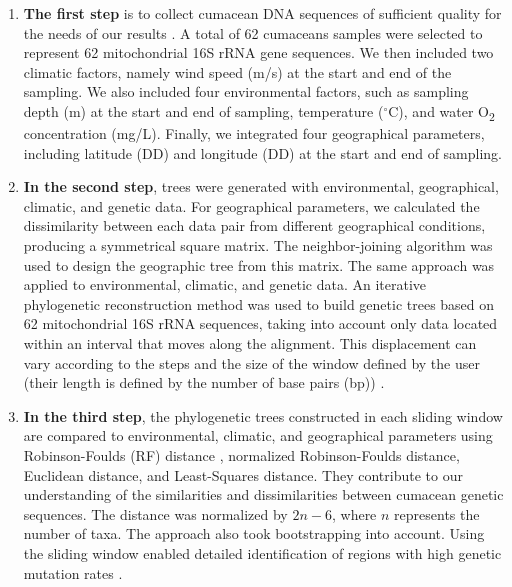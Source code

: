 \begin{enumerate}
\item \textbf{The first step} is to collect cumacean DNA sequences of sufficient quality for the needs of our results \citep{koshkarov_phylogeography_2022}. A total of 62 cumaceans samples were selected to represent 62 mitochondrial 16S rRNA gene sequences. We then included two climatic factors, namely wind speed (m/s) at the start and end of the sampling. We also included four environmental factors, such as sampling depth (m) at the start and end of sampling, temperature ($^\circ$C), and water O\textsubscript{2} concentration (mg/L). Finally, we integrated four geographical parameters, including latitude (DD) and longitude (DD) at the start and end of sampling.

\item \textbf{In the second step}, trees were generated with environmental, geographical, climatic, and genetic data. For geographical parameters, we calculated the dissimilarity between each data pair from different geographical conditions, producing a symmetrical square matrix. The neighbor-joining algorithm was used to design the geographic tree from this matrix. The same approach was applied to environmental, climatic, and genetic data. An iterative phylogenetic reconstruction method was used to build genetic trees based on 62 mitochondrial 16S rRNA sequences, taking into account only data located within an interval that moves along the alignment. This displacement can vary according to the steps and the size of the window defined by the user (their length is defined by the number of base pairs (bp)) \citep{koshkarov_phylogeography_2022}.

\item \textbf{In the third step}, the phylogenetic trees constructed in each sliding window are compared to environmental, climatic, and geographical parameters using Robinson-Foulds (RF) distance \citep{robinson_comparison_1981, koshkarov_phylogeography_2022}, normalized Robinson-Foulds distance, Euclidean distance, and Least-Squares distance. They contribute to our understanding of the similarities and dissimilarities between cumacean genetic sequences. The distance was normalized by $2n-6$, where $n$ represents the number of taxa. The approach also took bootstrapping into account. Using the sliding window enabled detailed identification of regions with high genetic mutation rates \citep{koshkarov_phylogeography_2022}.
\end{enumerate}

